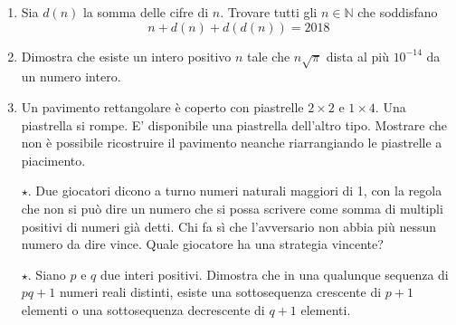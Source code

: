 \documentclass[a4paper]{article}
\theoremstyle{remark}
\theoremstyle{definition}
\begin{document}
\begin{enumerate}
	\item Sia $ d(n) $ la somma delle cifre di $ n $. Trovare tutti gli $ n \in \mathbb{N} $ che soddisfano
	\[ n + d(n) + d(d(n)) = 2018 \]
	
	
	\item Dimostra che esiste un intero positivo $ n $ tale che $ n\sqrt{\pi} $ dista al più $ 10^{-14} $ da un numero intero.
	
	\item Un pavimento rettangolare è coperto con piastrelle $ 2 \times 2 $ e $ 1 \times 4 $. Una piastrella si rompe. E' disponibile una piastrella dell'altro tipo. Mostrare che non è possibile ricostruire il pavimento neanche riarrangiando le piastrelle a piacimento.
	
	\item[$ \star $.]  Due giocatori dicono a turno numeri naturali maggiori di 1, con la regola che non si
	può dire un numero che si possa scrivere come somma di multipli positivi di numeri
	già detti. Chi fa sì che l’avversario non abbia più nessun numero da dire vince. Quale
	giocatore ha una strategia vincente?
	
	
	
	\item[$ \star $.] Siano $ p $ e $ q $ due interi positivi. Dimostra che in una qualunque sequenza di $ pq+1 $ numeri reali distinti, esiste una sottosequenza crescente di $ p+1 $ elementi o una sottosequenza decrescente di $ q+1 $ elementi.
	
	
	
	
	
	
\end{enumerate}
\end{document}
